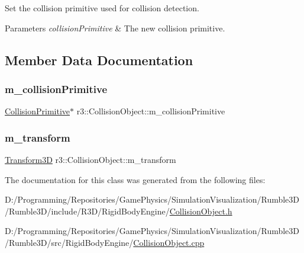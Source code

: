 Set the collision primitive used for collision detection. 


\begin{DoxyParams}{Parameters}
{\em collision\+Primitive} & The new collision primitive. \\
\hline
\end{DoxyParams}


\subsection{Member Data Documentation}
\mbox{\label{classr3_1_1_collision_object_afa62ecdda20144d43f9fcf72d56642d6}} 
\subsubsection{\texorpdfstring{m\+\_\+collision\+Primitive}{m\_collisionPrimitive}}
{\footnotesize\ttfamily \mbox{\hyperlink{classr3_1_1_collision_primitive}{Collision\+Primitive}}$\ast$ r3\+::\+Collision\+Object\+::m\+\_\+collision\+Primitive\hspace{0.3cm}{\ttfamily [protected]}}

\mbox{\label{classr3_1_1_collision_object_a2ed717150a250f1b81e23ba7e5431542}} 
\subsubsection{\texorpdfstring{m\+\_\+transform}{m\_transform}}
{\footnotesize\ttfamily \mbox{\hyperlink{classr3_1_1_transform3_d}{Transform3D}} r3\+::\+Collision\+Object\+::m\+\_\+transform\hspace{0.3cm}{\ttfamily [protected]}}



The documentation for this class was generated from the following files\+:\begin{DoxyCompactItemize}
\item 
D\+:/\+Programming/\+Repositories/\+Game\+Physics/\+Simulation\+Visualization/\+Rumble3\+D/\+Rumble3\+D/include/\+R3\+D/\+Rigid\+Body\+Engine/\mbox{\hyperlink{_collision_object_8h}{Collision\+Object.\+h}}\item 
D\+:/\+Programming/\+Repositories/\+Game\+Physics/\+Simulation\+Visualization/\+Rumble3\+D/\+Rumble3\+D/src/\+Rigid\+Body\+Engine/\mbox{\hyperlink{_collision_object_8cpp}{Collision\+Object.\+cpp}}\end{DoxyCompactItemize}
